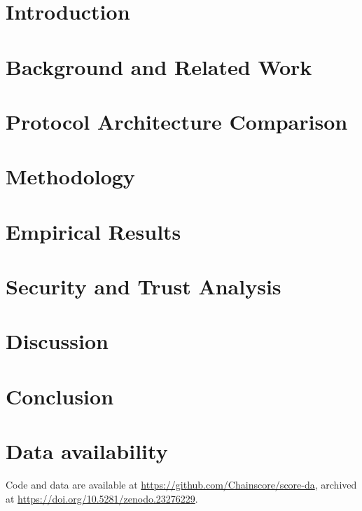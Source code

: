 \documentclass[5p,times,twocolumn,final]{elsarticle}
\newif\ifanonymous
\newcommand{\repolink}{\ifanonymous[repository withheld for anonymized review]\else\url{https://github.com/Chainscore/score-da}, archived at \url{https://doi.org/10.5281/zenodo.23276229}\fi}
\begin{document}
\section{Introduction}
\label{sec:introduction}


\section{Background and Related Work}
\label{sec:background}


\section{Protocol Architecture Comparison}
\label{sec:architecture}


\section{Methodology}
\label{sec:methodology}


\section{Empirical Results}
\label{sec:results}


\section{Security and Trust Analysis}
\label{sec:security}


\section{Discussion}
\label{sec:discussion}


\section{Conclusion}
\label{sec:conclusion}


\section*{Data availability}
Code and data are available at \repolink.
\end{document}
